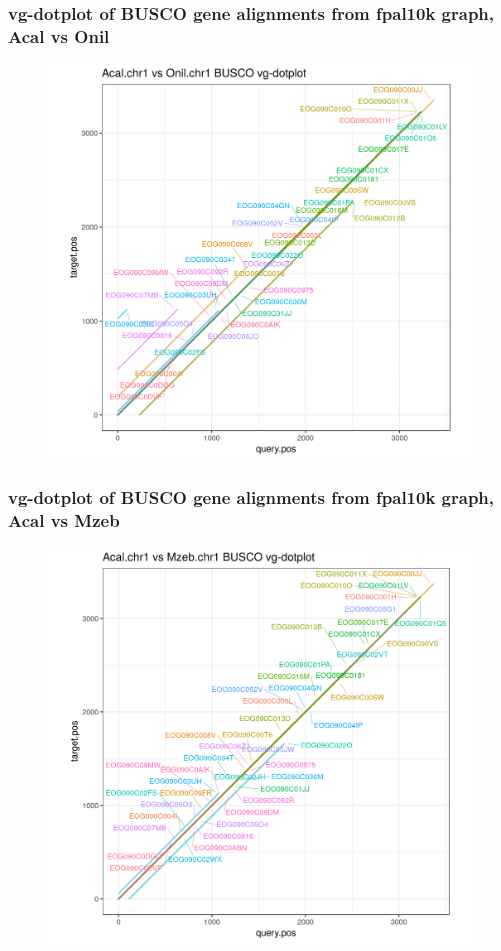 \documentclass[aspectratio=169]{beamer}
\begin{document}
\begin{frame}
  \frametitle{vg-dotplot of BUSCO gene alignments from fpal10k graph, Acal vs Onil}
  \begin{figure}
    \includegraphics[scale=0.42,center]{cichlid_chr1_fpal10k_busco_dotplot_Acal_Onil.png}
  \end{figure}
\end{frame}

\begin{frame}
  \frametitle{vg-dotplot of BUSCO gene alignments from fpal10k graph, Acal vs Mzeb}
  \begin{figure}
    \includegraphics[scale=0.42,center]{cichlid_chr1_fpal10k_busco_dotplot_Acal_Mzeb.png}
  \end{figure}
\end{frame}
\end{document}
